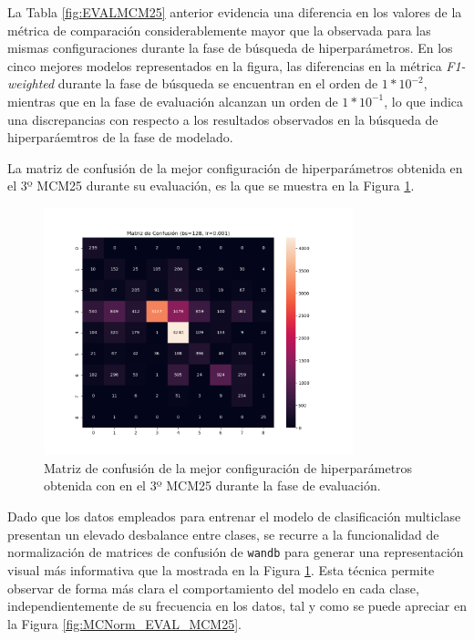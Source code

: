 La Tabla \ref{fig:EVALMCM25} anterior evidencia una diferencia en los valores de la métrica de comparación considerablemente mayor que la observada para las mismas configuraciones durante la fase de búsqueda de hiperparámetros. En los cinco mejores modelos representados en la figura, las diferencias en la métrica \textit{F1-weighted} durante la fase de búsqueda se encuentran en el orden de $1*10^{-2}$, mientras que en la fase de evaluación alcanzan un orden de $1*10^{-1}$, lo que indica una discrepancias con respecto a los resultados observados en la búsqueda de hiperparáemtros de la fase de modelado.

La matriz de confusión de la mejor configuración de hiperparámetros obtenida en el 3º MCM25 durante su evaluación, es la que se muestra en la Figura \ref{fig:MC_EVAL_MCM25}.

\begin{figure}[H]
    \centering
    \includegraphics[width=0.8\textwidth]{./img/evaluacion/matrices_confusion/MC_EVAL_MCM25.png}
    \caption{Matriz de confusión de la mejor configuración de hiperparámetros obtenida con en el 3º MCM25 durante la fase de evaluación.}
    \label{fig:MC_EVAL_MCM25}
\end{figure}

Dado que los datos empleados para entrenar el modelo de clasificación multiclase presentan un elevado desbalance entre clases, se recurre a la funcionalidad de normalización de matrices de confusión de \texttt{wandb} para generar una representación visual más informativa que la mostrada en la Figura \ref{fig:MC_EVAL_MCM25}. Esta técnica permite observar de forma más clara el comportamiento del modelo en cada clase, independientemente de su frecuencia en los datos, tal y como se puede apreciar en la Figura \ref{fig:MCNorm_EVAL_MCM25}.


